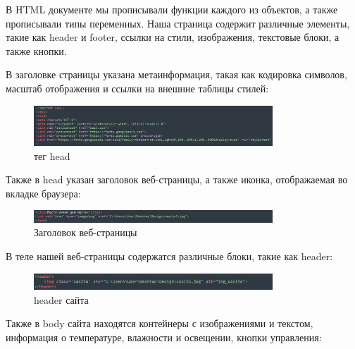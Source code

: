 В HTML документе мы прописывали функции каждого из объектов, а также прописывали типы переменных. Наша страница содержит различные элементы, такие как header и footer, ссылки на стили, изображения, текстовые блоки, а также кнопки.

В заголовке страницы указана метаинформация, такая как кодировка символов, масштаб отображения и ссылки на внешние таблицы стилей:

\begin{figure}[h!]
	\centering
	\label{fig:img39}
	\includegraphics[width=0.8\textwidth]{./graphics/img/image39.png}
	\caption{тег head}
\end{figure}

Также в head указан заголовок веб-страницы, а также иконка, отображаемая во вкладке браузера:

\begin{figure}[h!]
	\centering
	\label{fig:img19}
	\includegraphics[width=0.8\textwidth]{./graphics/img/image19.png}
	\caption{Заголовок веб-страницы}
\end{figure}

В теле нашей веб-страницы содержатся различные блоки, такие как header:

\begin{figure}[h!]
	\centering
	\label{fig:img38}
	\includegraphics[width=0.8\textwidth]{./graphics/img/image38.png}
	\caption{header сайта}
\end{figure}

Также в body сайта находятся контейнеры с изображениями и текстом, информация о температуре, влажности и освещении, кнопки управления:

